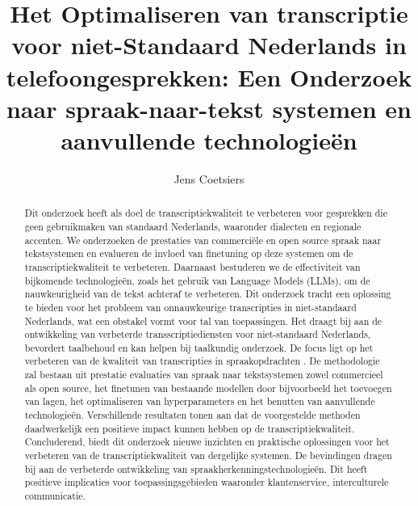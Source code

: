 \documentclass{hogent-article}
\title{Het Optimaliseren van transcriptie voor niet-Standaard Nederlands in telefoongesprekken: Een Onderzoek naar spraak-naar-tekst systemen en aanvullende technologieën}
\author{Jens Coetsiers}
\begin{document}
\begin{abstract}
Dit onderzoek heeft als doel de transcriptiekwaliteit te verbeteren voor gesprekken die geen gebruikmaken van standaard Nederlands, waaronder dialecten en regionale accenten. We onderzoeken de prestaties van commerciële en open source spraak naar tekstsystemen en evalueren de invloed van finetuning op deze systemen om de transcriptiekwaliteit te verbeteren. Daarnaast bestuderen we de effectiviteit van bijkomende technologieën, zoals het gebruik van Language Models (LLMs), om de nauwkeurigheid van de tekst achteraf te verbeteren. Dit onderzoek tracht een oplossing te bieden voor het probleem van onnauwkeurige transcripties in niet-standaard Nederlands, wat een obstakel vormt voor tal van toepassingen. Het draagt bij aan de ontwikkeling van verbeterde transscriptiediensten voor niet-standaard Nederlands, bevordert taalbehoud en kan helpen bij taalkundig onderzoek. De focus ligt op het verbeteren van de kwaliteit van transcripties in spraakopdrachten .
De methodologie zal bestaan uit prestatie evaluaties van spraak naar tekstsystemen zowel commercieel als open source, het finetunen van bestaande modellen door bijvoorbeeld het toevoegen van lagen, het optimaliseren van hyperparameters en het benutten van aanvullende technologieën.
Verschillende resultaten tonen aan dat de voorgestelde methoden daadwerkelijk een positieve impact kunnen hebben op de transcriptiekwaliteit.
Concluderend, biedt dit onderzoek nieuwe inzichten en praktische oplossingen voor het verbeteren van de transcriptiekwaliteit van dergelijke systemen. De bevindingen dragen bij aan de verbeterde ontwikkeling van spraakherkenningstechnologieën. Dit heeft positieve implicaties voor toepassingsgebieden waaronder klantenservice, interculturele communicatie.
\end{abstract}

\tableofcontents



\printbibliography[heading=bibintoc]
\end{document}
